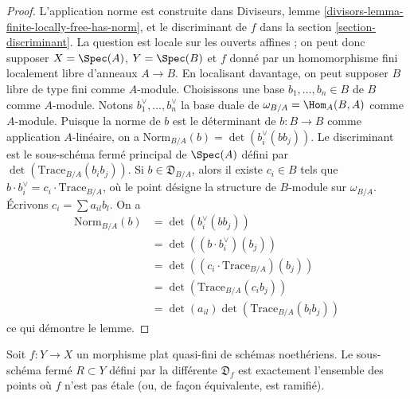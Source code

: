 \begin{proof}
L'application norme est construite dans
Diviseurs, lemme \ref{divisors-lemma-finite-locally-free-has-norm},
et le discriminant de $f$ dans la section \ref{section-discriminant}.
La question est locale sur les ouverts affines ; on peut donc supposer $X = \Spec(A)$,
$Y = \Spec(B)$ et $f$ donné par un homomorphisme fini localement libre d'anneaux $A \to B$.
En localisant davantage, on peut supposer $B$ libre de type fini comme $A$-module.
Choisissons une base $b_1, \ldots, b_n \in B$ de $B$ comme $A$-module.
Notons $b_1^\vee, \ldots, b_n^\vee$ la base duale de
$\omega_{B/A} = \Hom_A(B, A)$ comme $A$-module.
Puisque la norme de $b$ est le déterminant de $b : B \to B$ comme
application $A$-linéaire, on a
$\text{Norm}_{B/A}(b) = \det(b_i^\vee(bb_j))$.
Le discriminant est le sous-schéma fermé principal de $\Spec(A)$
défini par $\det(\text{Trace}_{B/A}(b_ib_j))$.
Si $b \in \mathfrak{D}_{B/A}$, alors
il existe $c_i \in B$ tels que
$b \cdot b_i^\vee = c_i \cdot \text{Trace}_{B/A}$, où
le point désigne la structure de $B$-module sur $\omega_{B/A}$.
Écrivons $c_i = \sum a_{il} b_l$.
On a
\begin{align*}
\text{Norm}_{B/A}(b)
& =
\det(b_i^\vee(bb_j)) \\
& =
\det( (b \cdot b_i^\vee)(b_j)) \\
& =
\det((c_i \cdot \text{Trace}_{B/A})(b_j)) \\
& =
\det(\text{Trace}_{B/A}(c_ib_j)) \\
& =
\det(a_{il}) \det(\text{Trace}_{B/A}(b_l b_j))
\end{align*}
ce qui démontre le lemme.
\end{proof}

\begin{lemma}
\label{lemma-different-ramification}
Soit $f : Y \to X$ un morphisme plat quasi-fini de schémas noethériens.
Le sous-schéma fermé $R \subset Y$ défini par la différente $\mathfrak{D}_f$
est exactement l'ensemble des points où $f$ n'est pas étale
(ou, de façon équivalente, est ramifié).
\end{lemma}

